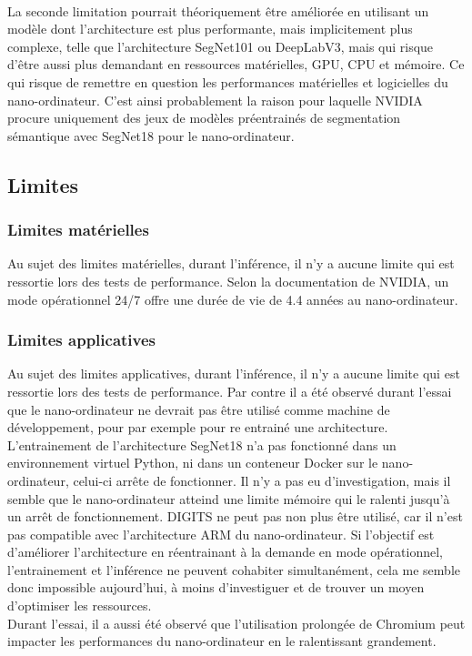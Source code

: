 \vspace{0.5\baselineskip}
\\
\noindent La seconde limitation pourrait théoriquement être améliorée en utilisant un modèle dont l'architecture est plus performante, mais implicitement plus complexe, telle que l'architecture SegNet101 ou DeepLabV3, mais qui risque d'être aussi plus demandant en ressources matérielles, GPU, CPU et mémoire. Ce qui risque de remettre en question les performances matérielles et logicielles du nano-ordinateur. C'est ainsi probablement la raison pour laquelle NVIDIA procure uniquement des jeux de modèles préentrainés de segmentation sémantique avec SegNet18 pour le nano-ordinateur. 
\subsection{Limites}
\subsubsection{Limites matérielles}
\noindent Au sujet des limites matérielles, durant l'inférence, il n'y a aucune limite qui est ressortie lors des tests de performance. Selon la documentation de NVIDIA, un mode opérationnel 24/7 offre une durée de vie de 4.4 années au nano-ordinateur.
\subsubsection{Limites applicatives}
\noindent Au sujet des limites applicatives, durant l'inférence, il n'y a aucune limite qui est ressortie lors des tests de performance. Par contre il a été observé durant l'essai que le nano-ordinateur ne devrait pas être utilisé comme machine de développement, pour par exemple pour re entrainé une architecture. L'entrainement de l'architecture SegNet18 n'a pas fonctionné dans un environnement virtuel Python, ni dans un conteneur Docker sur le nano-ordinateur, celui-ci arrête de fonctionner. Il n'y a pas eu d'investigation, mais il semble que le nano-ordinateur atteind une limite mémoire qui le ralenti jusqu'à un arrêt de fonctionnement. DIGITS ne peut pas non plus être utilisé, car il n'est pas compatible avec l'architecture ARM du nano-ordinateur. Si l'objectif est d'améliorer l'architecture en réentrainant à la demande en mode opérationnel, l'entrainement et l'inférence ne peuvent cohabiter simultanément, cela me semble donc impossible aujourd'hui, à moins d'investiguer et de trouver un moyen d'optimiser les ressources.
\vspace{0.5\baselineskip}
\\
\noindent Durant l'essai, il a aussi été observé que l'utilisation prolongée de Chromium peut impacter les performances du nano-ordinateur en le ralentissant grandement. 
